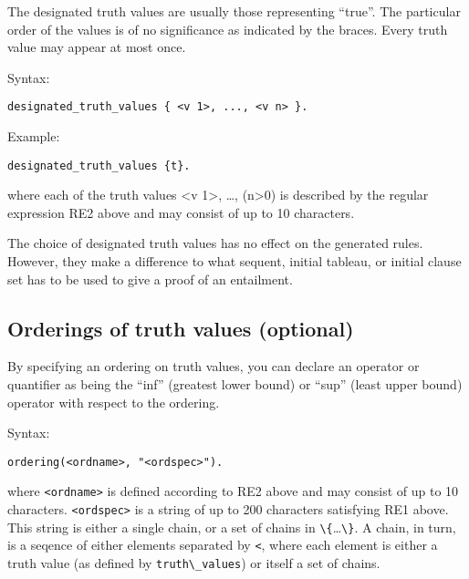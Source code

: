 \documentclass[]{article}
\newcommand{\passthrough}[1]{#1}
\begin{document}
The designated truth values are usually those representing ``true''. The
particular order of the values is of no significance as indicated by the
braces. Every truth value may appear at most once.

Syntax:

\begin{lstlisting}
designated_truth_values { <v 1>, ..., <v n> }.
\end{lstlisting}

Example:

\begin{lstlisting}
designated_truth_values {t}.
\end{lstlisting}

where each of the truth values \textless{}v 1\textgreater{}, \ldots{},
(n\textgreater{}0) is described by the regular expression RE2 above and
may consist of up to 10 characters.

The choice of designated truth values has no effect on the generated
rules. However, they make a difference to what sequent, initial tableau,
or initial clause set has to be used to give a proof of an entailment.

\hypertarget{orderings-of-truth-values-optional}{%
\subsection{Orderings of truth values
(optional)}\label{orderings-of-truth-values-optional}}

By specifying an ordering on truth values, you can declare an operator
or quantifier as being the ``inf'' (greatest lower bound) or ``sup''
(least upper bound) operator with respect to the ordering.

Syntax:

\begin{lstlisting}
ordering(<ordname>, "<ordspec>").
\end{lstlisting}

where \passthrough{\lstinline!<ordname>!} is defined according to RE2
above and may consist of up to 10 characters.
\passthrough{\lstinline!<ordspec>!} is a string of up to 200 characters
satisfying RE1 above. This string is either a single chain, or a set of
chains in
\passthrough{\lstinline!\{!}\ldots{}\passthrough{\lstinline!\}!}. A
chain, in turn, is a seqence of either elements separated by
\passthrough{\lstinline!<!}, where each element is either a truth value
(as defined by \passthrough{\lstinline!truth\_values!}) or itself a set
of chains.
\end{document}

